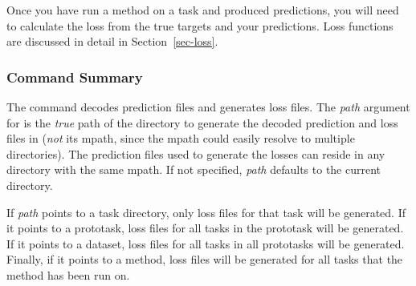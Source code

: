 %
%


Once you have run a method on a task and produced predictions, you
will need to calculate the loss from the true targets and your
predictions.  Loss functions are discussed in detail in
Section~\ref{sec-loss}.

\subsubsection*{Command Summary}

The \mloss{} command decodes prediction files and generates loss
files.  The \textit{path} argument for \mloss{} is the \emph{true}
path of the directory to generate the decoded prediction and loss
files in (\emph{not} its mpath, since the mpath could easily resolve
to multiple directories).  The prediction files used to generate the
losses can reside in any directory with the same mpath.  If not
specified, \textit{path} defaults to the current directory.

If \textit{path} points to a task directory, only loss files for that
task will be generated.  If it points to a prototask, loss files for
all tasks in the prototask will be generated.  If it points to a
dataset, loss files for all tasks in all prototasks will be generated.
Finally, if it points to a method, loss files will be generated for
all tasks that the method has been run on.

